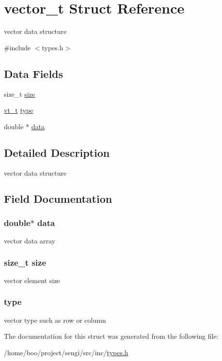 \hypertarget{structvector__t}{\section{vector\+\_\+t Struct Reference}
\label{structvector__t}
}


vector data structure  




{\ttfamily \#include $<$types.\+h$>$}

\subsection*{Data Fields}
\begin{DoxyCompactItemize}
\item 
size\+\_\+t \hyperlink{structvector__t_a854352f53b148adc24983a58a1866d66}{size}
\item 
\hyperlink{types_8h_a9d9a30fda099fc2b9478f83db57b3c0e}{vt\+\_\+t} \hyperlink{structvector__t_acc76c3ba44d6963cf8d3f76a21c4260d}{type}
\item 
double $\ast$ \hyperlink{structvector__t_a23436a7a2b44939627b59df11be7ad75}{data}
\end{DoxyCompactItemize}


\subsection{Detailed Description}
vector data structure 

\subsection{Field Documentation}
\hypertarget{structvector__t_a23436a7a2b44939627b59df11be7ad75}{
\subsubsection[{data}]{\setlength{\rightskip}{0pt plus 5cm}double$\ast$ data}}\label{structvector__t_a23436a7a2b44939627b59df11be7ad75}
vector data array \hypertarget{structvector__t_a854352f53b148adc24983a58a1866d66}{
\subsubsection[{size}]{\setlength{\rightskip}{0pt plus 5cm}size\+\_\+t size}}\label{structvector__t_a854352f53b148adc24983a58a1866d66}
vector element size \hypertarget{structvector__t_acc76c3ba44d6963cf8d3f76a21c4260d}{
\subsubsection[{type}]{ type}}\label{structvector__t_acc76c3ba44d6963cf8d3f76a21c4260d}
vector type such as row or column 

The documentation for this struct was generated from the following file\+:\begin{DoxyCompactItemize}
\item 
/home/boo/project/sengi/src/inc/\hyperlink{types_8h}{types.\+h}\end{DoxyCompactItemize}

